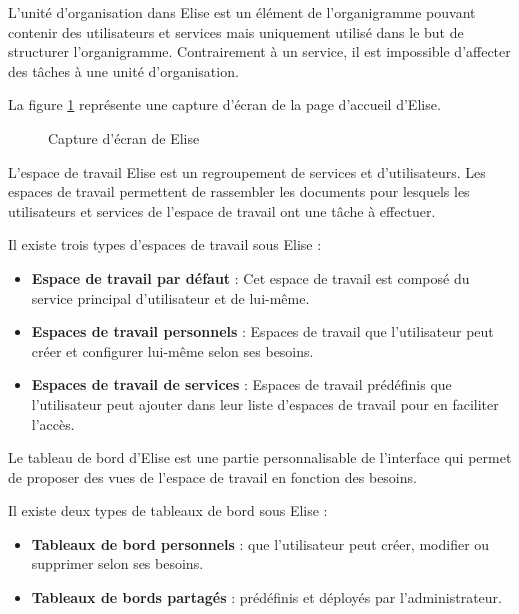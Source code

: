 L'unité d'organisation dans Elise est un élément de l'organigramme pouvant contenir des utilisateurs et services mais uniquement utilisé dans le but de structurer l'organigramme. Contrairement à un service, il est impossible d'affecter des tâches à une unité d'organisation.

La figure \ref{fig:captureElise} représente une capture d'écran de la page d'accueil d'Elise.\\

\begin{figure}[!h]
\centering
{}
\caption{Capture d'écran de Elise}
\label{fig:captureElise}
\end{figure}


L'espace de travail Elise est un regroupement de services et d'utilisateurs. Les espaces de travail permettent de rassembler les documents pour lesquels les utilisateurs et services de l'espace de travail ont une tâche à effectuer.

Il existe trois types d'espaces de travail sous Elise :

\begin{itemize}

\item \textbf{Espace de travail par défaut} : Cet espace de travail est composé du service principal d'utilisateur et de lui-même.
\item \textbf{Espaces de travail personnels} : Espaces de travail que l'utilisateur peut créer et configurer lui-même selon ses besoins.
\item \textbf{Espaces de travail de services} : Espaces de travail prédéfinis que l'utilisateur peut ajouter dans leur liste d'espaces de travail pour en faciliter l'accès.
\end{itemize}

Le tableau de bord d'Elise est une partie personnalisable de l'interface qui permet de proposer des vues de l'espace de travail en fonction des besoins. 

Il existe deux types de tableaux de bord sous Elise :

\begin{itemize}
\item \textbf{Tableaux de bord personnels} : que l'utilisateur peut créer, modifier ou supprimer selon ses besoins.
\item \textbf{Tableaux de bords partagés} : prédéfinis et déployés par l'administrateur.
\end{itemize}

